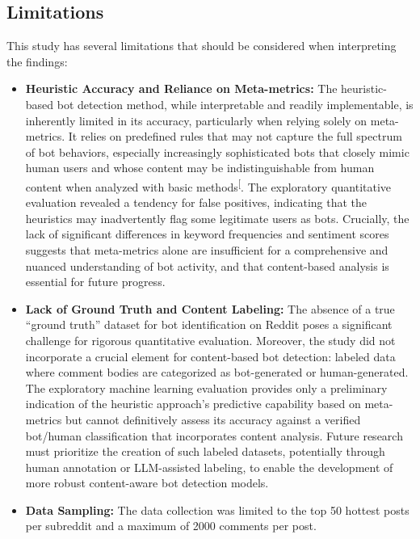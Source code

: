 \documentclass[
  12pt,
  letterpaper,
  DIV=11,
  numbers=noendperiod]{scrartcl}
\begin{document}
\subsection{Limitations}\label{limitations}

This study has several limitations that should be considered when
interpreting the findings:

\begin{itemize}
\item
  \textbf{Heuristic Accuracy and Reliance on Meta-metrics:} The
  heuristic-based bot detection method, while interpretable and readily
  implementable, is inherently limited in its accuracy, particularly
  when relying solely on meta-metrics. It relies on predefined rules
  that may not capture the full spectrum of bot behaviors, especially
  increasingly sophisticated bots that closely mimic human users and
  whose content may be indistinguishable from human content when
  analyzed with basic
  methods\textsuperscript{{[}\citeproc{ref-botdetectionreddit}{1}{]}}.
  The exploratory quantitative evaluation revealed a tendency for false
  positives, indicating that the heuristics may inadvertently flag some
  legitimate users as bots. Crucially, the lack of significant
  differences in keyword frequencies and sentiment scores suggests that
  meta-metrics alone are insufficient for a comprehensive and nuanced
  understanding of bot activity, and that content-based analysis is
  essential for future progress.
\item
  \textbf{Lack of Ground Truth and Content Labeling:} The absence of a
  true ``ground truth'' dataset for bot identification on Reddit poses a
  significant challenge for rigorous quantitative evaluation. Moreover,
  the study did not incorporate a crucial element for content-based bot
  detection: labeled data where comment bodies are categorized as
  bot-generated or human-generated. The exploratory machine learning
  evaluation provides only a preliminary indication of the heuristic
  approach's predictive capability based on meta-metrics but cannot
  definitively assess its accuracy against a verified bot/human
  classification that incorporates content analysis. Future research
  must prioritize the creation of such labeled datasets, potentially
  through human annotation or LLM-assisted labeling, to enable the
  development of more robust content-aware bot detection models.
\item
  \textbf{Data Sampling:} The data collection was limited to the top 50
  hottest posts per subreddit and a maximum of 2000 comments per post.

\end{itemize}
\end{document}
